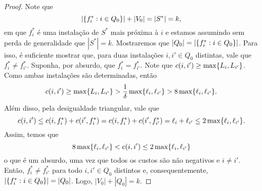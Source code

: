 \begin{proof}
    Note que 
    \begin{equation}
        |\{f_i^* : i \in Q_0\}| + |V_0| = |S^*| = k \nonumber,
    \end{equation}
    em que $f_i^*$ é uma instalação de $S^*$ mais próxima à $i$ e estamos assumindo sem perda de generalidade que $|S^*| = k$. Mostraremos que $ |Q_0| = |\{f_i^* : i \in Q_0\}|$. Para isso, é suficiente mostrar que, para duas instalações $i,i' \in Q_0$ distintas, vale que $f_i^* \neq f_{i'}^*$. Suponha, por absurdo, que $f_i^* = f_{i'}^*$. Note que $c(i,i') \geq \max\{L_i,L_{i'}\}$. Como ambas instalações são determinadas, então 
    \begin{equation}
        c(i,i') \geq \max\{L_i,L_{i'}\} > \frac{1}{\delta}\max\{\ell_i,\ell_{i'}\} > 8 \max\{\ell_i,\ell_{i'}\}. \nonumber
    \end{equation}
    Além disso, pela desigualdade triangular, vale que 
    \begin{equation}
        c(i,i') \leq c(i,f_i^*) + c(i',f_i^*) = c(i,f_i^*) + c(i',f_{i'}^*) = \ell_i + \ell_{i'}\leq 2 \max\{\ell_i,\ell_{i'}\}. \nonumber
    \end{equation}
    Assim, temos que
    \[ 8 \max\{\ell_i,\ell_{i'}\} < c(i,i') \leq 2 \max\{\ell_i,\ell_{i'}\}\]
    o que é um absurdo, uma vez que todos os custos são não negativos e $i \neq i'$. Então, $f_i^* \neq f_{i'}^*$ para todo $i,i' \in Q_0$ distintos e, consequentemente, ${|\{f_i^*: i \in Q_0\}| = |Q_0|}$. Logo, $|V_0| + |Q_0| = k$. 
    \end{proof}

